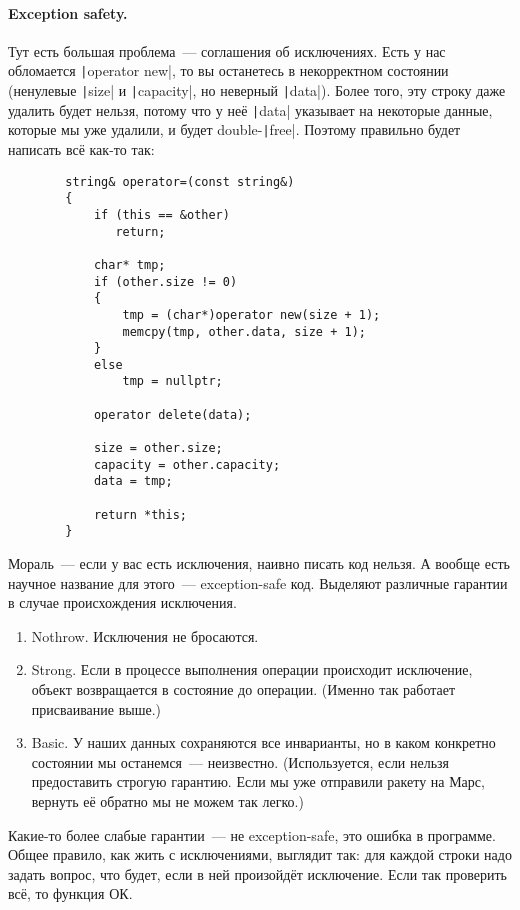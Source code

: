 \documentclass{article}
\begin{document}
    \paragraph{Exception safety.}
    Тут есть большая проблема~--- соглашения об исключениях. Есть у нас обломается \texttt|operator new|, то вы останетесь в некорректном состоянии (ненулевые \texttt|size| и \texttt|capacity|, но неверный \texttt|data|). Более того, эту строку даже удалить будет нельзя, потому что у неё \texttt|data| указывает на некоторые данные, которые мы уже удалили, и будет double-\texttt|free|. Поэтому правильно будет написать всё как-то так:
    \begin{verbatim}
        string& operator=(const string&)
        {
            if (this == &other)
               return;

            char* tmp;
            if (other.size != 0)
            {
                tmp = (char*)operator new(size + 1);
                memcpy(tmp, other.data, size + 1);
            }
            else
                tmp = nullptr;

            operator delete(data);
            
            size = other.size;
            capacity = other.capacity;
            data = tmp;

            return *this;
        }
    \end{verbatim}
    Мораль~--- если у вас есть исключения, наивно писать код нельзя. А вообще есть научное название для этого~--- exception-safe код. Выделяют различные гарантии в случае происхождения исключения.
    \begin{enumerate}
        \item Nothrow. Исключения не бросаются.
        \item Strong. Если в процессе выполнения операции происходит исключение, объект возвращается в состояние до операции. (Именно так работает присваивание выше.)
        \item Basic. У наших данных сохраняются все инварианты, но в каком конкретно состоянии мы останемся~--- неизвестно. (Используется, если нельзя предоставить строгую гарантию. Если мы уже отправили ракету на Марс, вернуть её обратно мы не можем так легко.)
    \end{enumerate}
    Какие-то более слабые гарантии~--- не exception-safe, это ошибка в программе. Общее правило, как жить с исключениями, выглядит так: для каждой строки надо задать вопрос, что будет, если в ней произойдёт исключение. Если так проверить всё, то функция ОК.\\
\end{document}
